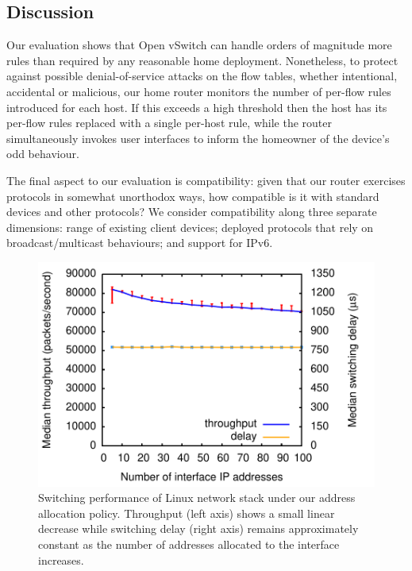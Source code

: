 \subsection{Discussion}

Our evaluation shows that Open vSwitch can handle orders of magnitude
more rules than required by any reasonable home deployment.  Nonetheless,
to protect against possible denial-of-service attacks on the flow
tables, whether intentional, accidental or malicious, our home router
monitors the number of per-flow rules introduced for each host.  If
this exceeds a high threshold then the host has its per-flow rules
replaced with a single per-host rule, while the router simultaneously
invokes user interfaces to inform the homeowner of the device's odd
behaviour. 

The final aspect to our evaluation is compatibility: given that our
router exercises protocols in somewhat unorthodox ways, how compatible
is it with standard devices and other protocols?  We consider
compatibility along three separate dimensions: range of existing
client devices; deployed protocols that rely on broadcast/multicast
behaviours; and support for IPv6. 

\begin{figure}
\centering
\includegraphics[width=\columnwidth]{stack-throughput}
\caption{\label{f:stack-throughput}Switching performance of Linux
        network stack under our address allocation policy. Throughput
        (left axis) shows a small linear decrease while switching
        delay (right axis) remains approximately constant as the
        number of addresses allocated to the interface increases.} 
\vspace{-1em}
\end{figure}

